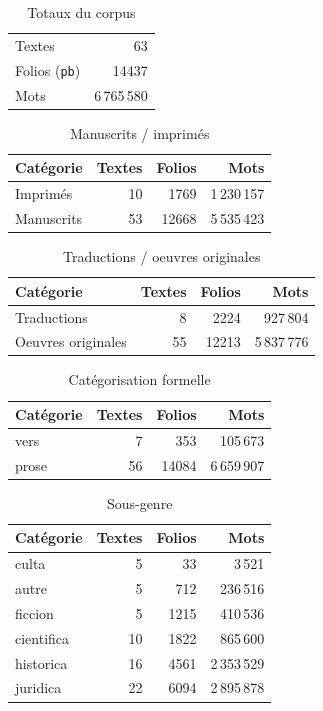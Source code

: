 \begin{table}[h]
  \centering
  \caption{Totaux du corpus}
  \begin{tabular}{lr}
    \hline
    Textes & 63 \\
    Folios (\texttt{pb}) & 14437 \\
    Mots & 6\,765\,580 \\
    \hline
  \end{tabular}
\end{table}

\begin{table}[h]
  \centering
  \caption{Manuscrits / imprimés}
  \begin{tabular}{lrrr}
    \hline
    Catégorie & Textes & Folios & Mots \\
    \hline
    Imprimés & 10 & 1769 & 1\,230\,157 \\
    Manuscrits & 53 & 12668 & 5\,535\,423 \\
    \hline
  \end{tabular}
\end{table}

\begin{table}[h]
  \centering
  \caption{Traductions / oeuvres originales}
  \begin{tabular}{lrrr}
    \hline
    Catégorie & Textes & Folios & Mots \\
    \hline
    Traductions & 8 & 2224 & 927\,804 \\
    Oeuvres originales & 55 & 12213 & 5\,837\,776 \\
    \hline
  \end{tabular}
\end{table}

\begin{table}[h]
  \centering
  \caption{Catégorisation formelle }
  \begin{tabular}{lrrr}
    \hline
    Catégorie & Textes & Folios & Mots \\
    \hline
    vers & 7 & 353 & 105\,673 \\
    prose & 56 & 14084 & 6\,659\,907 \\
    \hline
  \end{tabular}
\end{table}

\begin{table}[h]
  \centering
  \caption{Sous-genre}
  \begin{tabular}{lrrr}
    \hline
    Catégorie & Textes & Folios & Mots \\
    \hline
    culta & 5 & 33 & 3\,521 \\
    autre & 5 & 712 & 236\,516 \\
    ficcion & 5 & 1215 & 410\,536 \\
    cientifica & 10 & 1822 & 865\,600 \\
    historica & 16 & 4561 & 2\,353\,529 \\
    juridica & 22 & 6094 & 2\,895\,878 \\
    \hline
  \end{tabular}
\end{table}

